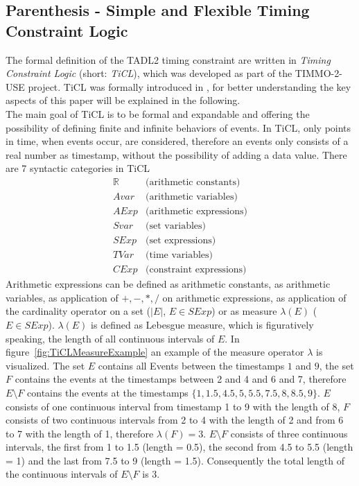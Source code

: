 \subsection{Parenthesis - Simple and Flexible Timing Constraint Logic}
	The formal definition of the TADL2 timing constraint are written in \emph{Timing Constraint Logic} (short: \emph{TiCL}), which was developed as part of the TIMMO-2-USE project. TiCL was formally introduced in \cite{TiCL}, for better understanding the key aspects of this paper will be explained in the following.\\
	The main goal of TiCL is to be formal and expandable and offering the possibility of defining finite and infinite behaviors of events. In TiCL, only points in time, when events occur, are considered, therefore an events only consists of a real number as timestamp, without the possibility of adding a data value. There are 7 syntactic categories in TiCL
	\begin{align*}
		\mathbb{R} &\text{(arithmetic constants)}\\
		Avar &\text{(arithmetic variables)}\\
		AExp &\text{(arithmetic expressions)}\\[10pt]
		Svar &\text{(set variables)}\\
		SExp &\text{(set expressions)}\\[10pt]
		TVar &\text{(time variables)}\\
		CExp &\text{(constraint expressions)}
	\end{align*}
	Arithmetic expressions can be defined as arithmetic constants, as arithmetic variables, as application of $+,-,*,/$ on arithmetic expressions, as application of the cardinality operator on a set ($|E|$, $E\in SExp$) or as measure $\lambda(E)$ ($E\in SExp$). $\lambda(E)$ is defined as Lebesgue measure, which is figuratively speaking, the length of all continuous intervals of $E$. In figure~\ref{fig:TiCLMeasureExample} an example of the measure operator $\lambda$ is visualized. The set $E$ contains all Events between the timestamps $1$ and $9$, the set $F$ contains the events at the timestamps between 2 and 4 and 6 and 7, therefore $E\setminus F$ contains the events at the timestamps $\{1, 1.5, 4.5, 5, 5.5, 7.5, 8, 8.5, 9\}$.
	$E$ consists of one continuous interval from timestamp 1 to 9 with the length of 8, $F$ consists of two continuous intervals from 2 to 4 with the length of 2 and from 6 to 7 with the length of 1, therefore $\lambda(F)=3$. $E\setminus F$ consists of three continuous intervals, the first from 1 to 1.5 (length = 0.5), the second from 4.5 to 5.5 (length = 1) and the last from 7.5 to 9 (length = 1.5). Consequently the total length of the continuous intervals of $E\setminus F$ is 3.\\
